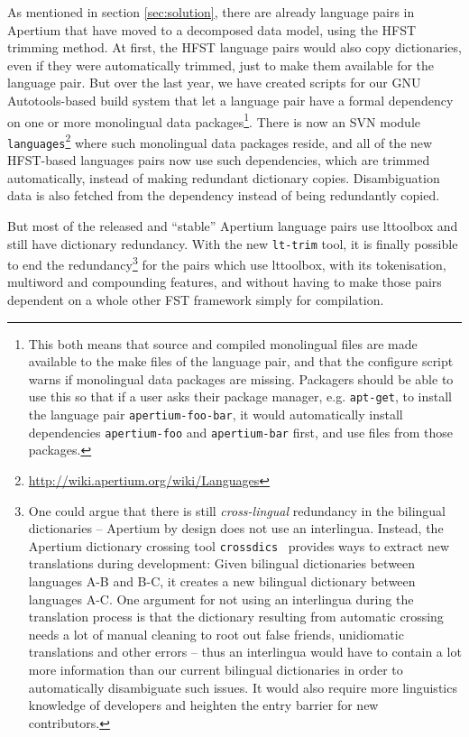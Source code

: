 \documentclass[10pt, a4paper]{article}
\newcommand{\tool}[1]{\texttt{#1}}
\begin{document}
As mentioned in section \ref{sec:solution}, there are already language
pairs in Apertium that have moved to a decomposed data model, using
the HFST trimming method. At first, the HFST language
pairs would also copy dictionaries, even if they were automatically
trimmed, just to make them available for the language pair.  But over
the last year, we have created scripts for our GNU Autotools-based
build system that let a language pair have a formal dependency on one
or more monolingual data packages\footnote{This both means that source
    and compiled monolingual files are made available to the make
    files of the language pair, and that the configure script warns if
    monolingual data packages are missing. Packagers should be able to
    use this so 
    that if a user asks their package manager, e.g. \tool{apt-get}, to
    install the language pair \tool{apertium-foo-bar}, it would
automatically install dependencies \tool{apertium-foo} and
\tool{apertium-bar} first, and use files from those packages.}.  There
is now an SVN module
\texttt{languages}\footnote{\href{http://wiki.apertium.org/wiki/Languages}{http://wiki.apertium.org/wiki/Languages}}
where such monolingual data packages reside, and all of the new
HFST-based languages pairs now use such dependencies, which are
trimmed automatically, instead of making redundant dictionary copies.
Disambiguation data is also fetched from the dependency instead of
being redundantly copied.

But most of the released and ``stable'' Apertium language pairs use
lttoolbox and still have dictionary redundancy. With the new
\tool{lt-trim} tool, it is finally possible to end the
redundancy\footnote{One could argue that there is still
  \emph{cross-lingual} redundancy in the bilingual dictionaries --
  Apertium by design does not use an interlingua. Instead, the
  Apertium dictionary crossing tool
  \tool{crossdics}~\cite{toral2011crossdics-it-ca} provides ways to
  extract new translations during development: Given bilingual
  dictionaries between languages A-B and B-C, it creates a new
  bilingual dictionary between languages A-C. One argument for not
  using an interlingua during the translation process is that the
  dictionary resulting from automatic crossing needs a lot of manual
  cleaning to root out false friends, unidiomatic translations and
  other errors -- thus an interlingua would have to contain a lot more
  information than our current bilingual dictionaries in order to
  automatically disambiguate such issues. It would also require more
  linguistics knowledge of developers and heighten the entry barrier
  for new contributors.} for the pairs which use lttoolbox,
with its tokenisation, multiword and compounding features, and without
having to make those pairs dependent on a whole other FST framework
simply for compilation.
\end{document}

